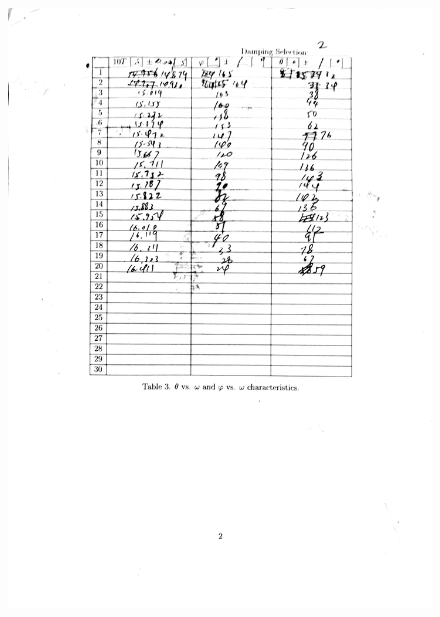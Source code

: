 \documentclass[a4paper]{report}
\begin{document}
	\begin{figure}[H]
		\centering
		\includegraphics[width=1\linewidth]{11.jpg}
	\end{figure}
\end{document}
